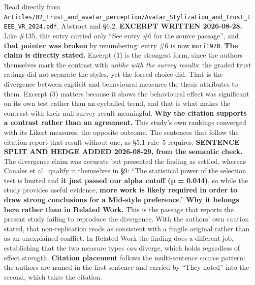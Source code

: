 \documentclass[11pt, a4paper]{article}
\begin{document}
\begin{Form}
  {Read directly from \texttt{\footnotesize Articles/02\_trust\_and\_avatar\_perception/Avatar\_Stylization\_and\_Trust\_IEEE\_VR\_2024.pdf}, Abstract and \S6.2. \textbf{EXCERPT WRITTEN 2026-08-28.} Like \#135, this entry carried only ``See entry \#6 for the source passage'', and \textbf{that pointer was broken} by renumbering: entry \#6 is now \texttt{mori1970}. \textbf{The claim is directly stated.} Excerpt (1) is the strongest form, since the authors themselves mark the contrast with \emph{unlike with the survey results}: the graded trust ratings did not separate the styles, yet the forced choice did. That is the divergence between explicit and behavioural measures the thesis attributes to them. Excerpt (3) matters because it shows the behavioural effect was significant on its own test rather than an eyeballed trend, and that is what makes the contrast with their null survey result meaningful. \textbf{Why the citation supports a contrast rather than an agreement.} This study's own rankings converged with its Likert measures, the opposite outcome. The sentences that follow the citation report that result without one, as \S5.1 rule~5 requires. \textbf{SENTENCE SPLIT AND HEDGE ADDED 2026-08-29, from the semantic check.} The divergence claim was accurate but presented the finding as settled, whereas Canales et al.\ qualify it themselves in \S9: ``The statistical power of the selection test is limited and \textbf{it just passed our alpha cutoff (p = 0.044)}, so while the study provides useful evidence, \textbf{more work is likely required in order to draw strong conclusions for a Mid-style preference}.'' \textbf{Why it belongs here rather than in Related Work.} This is the passage that reports the present study failing to reproduce the divergence. With the authors' own caution stated, that non-replication reads as consistent with a fragile original rather than as an unexplained conflict. In Related Work the finding does a different job, establishing that the two measure types \emph{can} diverge, which holds regardless of effect strength. \textbf{Citation placement} follows the multi-sentence source pattern: the authors are named in the first sentence and carried by ``They noted'' into the second, which takes the citation.}



\end{Form}
\end{document}
